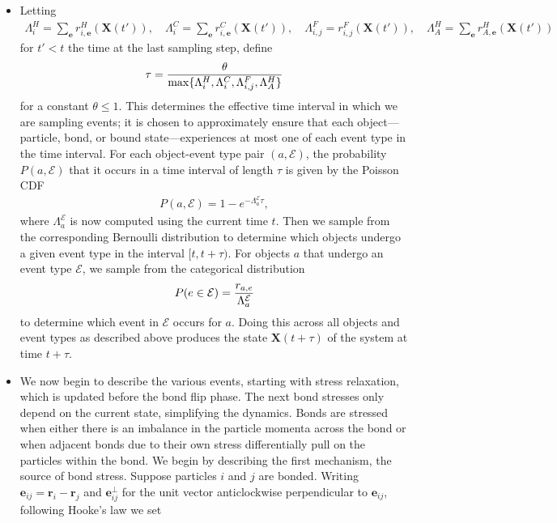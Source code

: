 \documentclass[12pt,letterpaper]{article}
\newcommand{\mb}{\mathbf}
\newcommand{\mc}{\mathcal}
\begin{document}
\begin{itemize}
\item Letting
\begin{align*}
\Lambda^{H}_{i} = \sum_{\mb{e}}r^{H}_{i,\mb{e}}(\mb{X}(t')), \quad \Lambda^{C}_{i} = \sum_{\mb{e}}r^{C}_{i,\mb{e}}(\mb{X}(t')), \quad \Lambda^{F}_{i,j} = r^{F}_{i,j}(\mb{X}(t')), \quad \Lambda^{H}_{A} = \sum_{\mb{e}}r^{H}_{A,\mb{e}}(\mb{X}(t'))
\end{align*}
for $t' < t$ the time at the last sampling step, define
\begin{align*}
\tau = {\theta \over \max\{\Lambda^{H}_{i}, \Lambda^{C}_{i}, \Lambda^{F}_{i,j}, \Lambda^{H}_{A}\}}
\end{align*}
for a constant $\theta \leqslant 1$. This determines the effective time interval in which we are sampling events; it is chosen to approximately ensure that each object---particle, bond, or bound state---experiences at most one of each event type in the time interval. For each object-event type pair $(a, \mc{E})$, the probability $P(a, \mc{E})$ that it occurs in a time interval of length $\tau$ is given by the Poisson CDF
\begin{align*}
P(a, \mc{E}) = 1 - e^{-\Lambda^{\mc{E}}_{a}\tau},
\end{align*}
where $\Lambda^{\mc{E}}_{a}$ is now computed using the current time $t$. Then we sample from the corresponding Bernoulli distribution to determine which objects undergo a given event type in the interval $[t, t + \tau)$. For objects $a$ that undergo an event type $\mc{E}$, we sample from the categorical distribution
\begin{align*}
P(e \in \mc{E}) = {r_{a,e} \over \Lambda^{\mc{E}}_{a}}
\end{align*}
to determine which event in $\mc{E}$ occurs for $a$. Doing this across all objects and event types as described above produces the state $\mb{X}(t + \tau)$ of the system at time $t + \tau$.
\item We now begin to describe the various events, starting with stress relaxation, which is updated before the bond flip phase. The next bond stresses only depend on the current state, simplifying the dynamics. Bonds are stressed when either there is an imbalance in the particle momenta across the bond or when adjacent bonds due to their own stress differentially pull on the particles within the bond. We begin by describing the first mechanism, the source of bond stress. Suppose particles $i$ and $j$ are bonded. Writing $\mb{e}_{ij} = \mb{r}_{i} - \mb{r}_{j}$ and $\mb{e}^{\perp}_{ij}$ for the unit vector anticlockwise perpendicular to $\mb{e}_{ij}$, following Hooke's law we set

\end{itemize}
\end{document}

